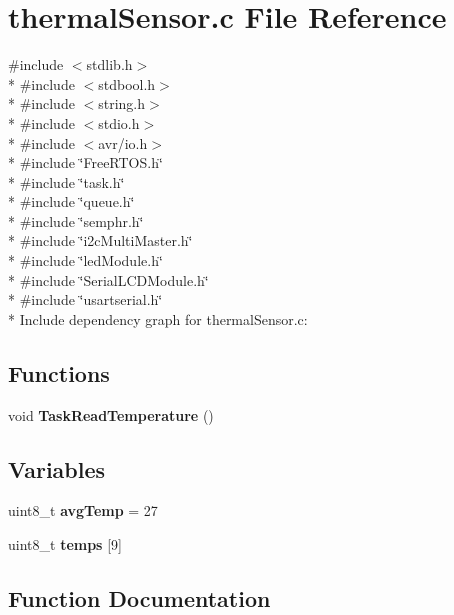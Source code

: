 \section{thermal\+Sensor.\+c File Reference}
\label{thermal_sensor_8c}
{\ttfamily \#include $<$stdlib.\+h$>$}\\*
{\ttfamily \#include $<$stdbool.\+h$>$}\\*
{\ttfamily \#include $<$string.\+h$>$}\\*
{\ttfamily \#include $<$stdio.\+h$>$}\\*
{\ttfamily \#include $<$avr/io.\+h$>$}\\*
{\ttfamily \#include \char`\"{}Free\+R\+T\+O\+S.\+h\char`\"{}}\\*
{\ttfamily \#include \char`\"{}task.\+h\char`\"{}}\\*
{\ttfamily \#include \char`\"{}queue.\+h\char`\"{}}\\*
{\ttfamily \#include \char`\"{}semphr.\+h\char`\"{}}\\*
{\ttfamily \#include \char`\"{}i2c\+Multi\+Master.\+h\char`\"{}}\\*
{\ttfamily \#include \char`\"{}led\+Module.\+h\char`\"{}}\\*
{\ttfamily \#include \char`\"{}Serial\+L\+C\+D\+Module.\+h\char`\"{}}\\*
{\ttfamily \#include \char`\"{}usartserial.\+h\char`\"{}}\\*
Include dependency graph for thermal\+Sensor.\+c\+:
\subsection*{Functions}
\begin{DoxyCompactItemize}
\item 
void {\bf Task\+Read\+Temperature} ()
\end{DoxyCompactItemize}
\subsection*{Variables}
\begin{DoxyCompactItemize}
\item 
uint8\+\_\+t {\bf avg\+Temp} = 27
\item 
uint8\+\_\+t {\bf temps} [9]
\end{DoxyCompactItemize}


\subsection{Function Documentation}
